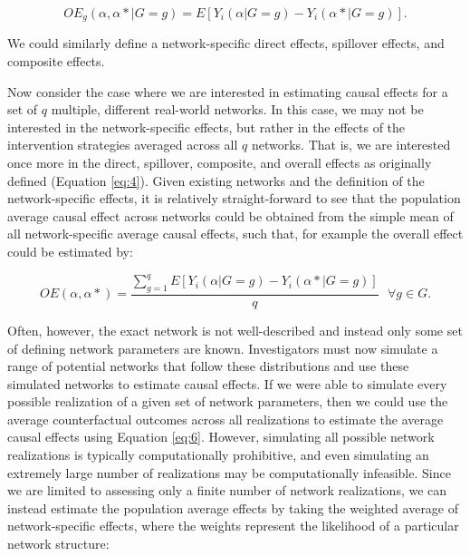 \documentclass{article}
\theoremstyle{definition}
\begin{document}
\begin{equation}\label{eq:5}
   OE_{g}\left(\alpha,\alpha* |G=g \right) = E[Y_{i}\left(\alpha|G=g\right) - Y_{i}\left(\alpha*|G=g\right)].	
\end{equation}

We could similarly define a network-specific direct effects, spillover effects, and composite effects.

Now consider the case where we are interested in estimating causal effects for a set of $q$ multiple, different real-world networks. In this case, we may not be interested in the network-specific effects, but rather in the effects of the intervention strategies averaged across all $q$ networks. That is, we are interested once more in the direct, spillover, composite, and overall effects as originally defined \cite{hudgens_toward_2008} (Equation \ref{eq:4}). Given existing networks and the definition of the network-specific effects, it is relatively straight-forward to see that the population average causal effect across networks could be obtained from the simple mean of all network-specific average causal effects, such that, for example the overall effect could be estimated by:

\begin{equation}\label{eq:6}
   OE\left(\alpha,\alpha* \right) = \frac{\sum_{g=1}^qE\left[Y_{i}\left(\alpha|G=g\right) - Y_{i}\left(\alpha*|G=g\right)\right]}{q} \text{   
 }\forall g \in G.	
\end{equation}


Often, however, the exact network is not well-described and instead only some set of defining network parameters are known. Investigators must now simulate a range of potential networks that follow these distributions and use these simulated networks to estimate causal effects. If we were able to simulate every possible realization of a given set of network parameters, then we could use the average counterfactual outcomes across all realizations to estimate the average causal effects using Equation \ref{eq:6}. However, simulating all possible network realizations is typically computationally prohibitive, and even simulating an extremely large number of realizations may be computationally infeasible. Since we are limited to assessing only a finite number of network realizations, we can instead estimate the population average effects by taking the weighted average of network-specific effects, where the weights represent the likelihood of a particular network structure:
\end{document}
